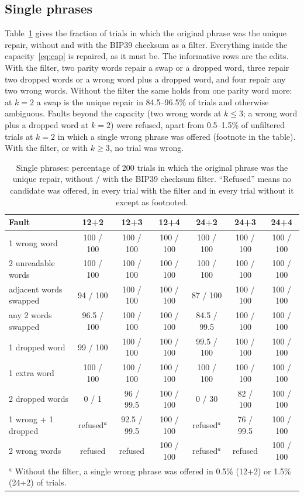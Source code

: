 \documentclass[numeric]{anvil-paper}
\begin{document}
\subsection{Single phrases}

Table~\ref{tab:single} gives the fraction of trials in which the original
phrase was the unique repair, without and with the BIP39 checksum as a filter.
Everything inside the capacity~\eqref{eq:cap} is repaired, as it must be. The
informative rows are the edits. With the filter, two parity words repair a
swap or a dropped word, three repair two dropped words or a wrong word plus a
dropped word, and four repair any two wrong words. Without the filter the
same holds from one parity word more: at $k=2$ a swap is the unique repair in
84.5--96.5\% of trials and otherwise ambiguous. Faults beyond the capacity
(two wrong words at $k\le3$; a wrong word plus a dropped word at $k=2$) were
refused, apart from 0.5--1.5\% of unfiltered trials at $k=2$ in which a single
wrong phrase was offered (footnote in the table). With the filter, or with
$k\ge 3$, no trial was wrong.

\begin{table}[!htb]
\centering
\caption{Single phrases: percentage of 200 trials in which the original phrase
was the unique repair, without / with the BIP39 checksum filter. ``Refused''
means no candidate was offered, in every trial with the filter and in every
trial without it except as footnoted.}
\label{tab:single}
\small
\begin{tabular}{lcccccc}
\toprule
Fault & 12+2 & 12+3 & 12+4 & 24+2 & 24+3 & 24+4 \\
\midrule
1 wrong word & 100 / 100 & 100 / 100 & 100 / 100 & 100 / 100 & 100 / 100 & 100 / 100 \\
2 unreadable words & 100 / 100 & 100 / 100 & 100 / 100 & 100 / 100 & 100 / 100 & 100 / 100 \\
adjacent words swapped & 94 / 100 & 100 / 100 & 100 / 100 & 87 / 100 & 100 / 100 & 100 / 100 \\
any 2 words swapped & 96.5 / 100 & 100 / 100 & 100 / 100 & 84.5 / 99.5 & 100 / 100 & 100 / 100 \\
1 dropped word & 99 / 100 & 100 / 100 & 100 / 100 & 99.5 / 100 & 100 / 100 & 100 / 100 \\
1 extra word & 100 / 100 & 100 / 100 & 100 / 100 & 100 / 100 & 100 / 100 & 100 / 100 \\
2 dropped words & 0 / 1 & 96 / 99.5 & 100 / 100 & 0 / 30 & 82 / 100 & 100 / 100 \\
1 wrong + 1 dropped & refused$^{a}$ & 92.5 / 99.5 & 100 / 100 & refused$^{a}$ & 76 / 99.5 & 100 / 100 \\
2 wrong words & refused & refused & 100 / 100 & refused$^{a}$ & refused & 100 / 100 \\
\bottomrule
\multicolumn{7}{l}{\footnotesize $^{a}$ Without the filter, a single wrong phrase
was offered in 0.5\% (12+2) or 1.5\% (24+2) of trials.}
\end{tabular}
\end{table}
\end{document}
